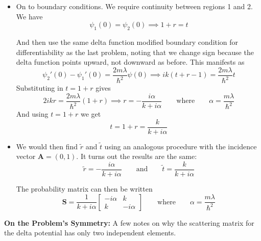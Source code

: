 \documentclass[11pt, a4paper]{article}
\newcommand{\eqtext}[1]{\qquad \text{#1} \qquad}
\renewcommand{\vec}[1]{\bm{#1}} %
\newcommand{\mat}[1]{\mathbf{#1}} %
\begin{document}
\begin{itemize}
	\item On to boundary conditions. We require continuity between regions 1 and 2. We have
	\begin{equation*}
		\psi_{1}(0) = \psi_{2}(0) \implies 1 + r = t
	\end{equation*} 
	
	And then use the same delta function modified boundary condition for differentiability as the last problem, noting that we change sign because the delta function points upward, not downward as before. This manifests as
	\begin{equation*}
		\psi_{2}'(0) - \psi_{1}'(0) = \frac{2m\lambda}{\hbar^{2}} \psi(0) \implies ik(t + r -1) = \frac{2m\lambda}{\hbar^{2}} t
	\end{equation*}
	Substituting in $ t = 1 + r $ gives
	\begin{equation*}
		2ikr = \frac{2m\lambda}{\hbar^{2}} (1 + r) \implies r = -\frac{i\alpha}{k + i\alpha} \eqtext{where} \alpha = \frac{m\lambda}{\hbar^{2}}
	\end{equation*}
	And using $ t = 1 + r $ we get
	\begin{equation*}
		t = 1 + r = \frac{k}{k + i\alpha}
	\end{equation*}
	
	\item We would then find $ \tilde{r} $ and $ \tilde{t} $ using an analogous procedure with the incidence vector $ \vec{A} = (0, 1) $. It turns out the results are the same:
	\begin{equation*}
		\tilde{r} = -\frac{i\alpha}{k + i\alpha}  \eqtext{and} \tilde{t} = \frac{k}{k + i\alpha}
	\end{equation*}
	
	The probability matrix can then be written
	\begin{equation*}
		\mat{S} = \frac{1}{k + i \alpha} 
		\begin{bmatrix}
			- i \alpha & k\\
			k & - i \alpha
		\end{bmatrix} 
		\eqtext{where}
		\alpha = \frac{m\lambda}{\hbar^{2}}
	\end{equation*}
\end{itemize}
\textbf{On the Problem's Symmetry:} A few notes on why the scattering matrix for the delta potential has only two independent elements.
\end{document}
